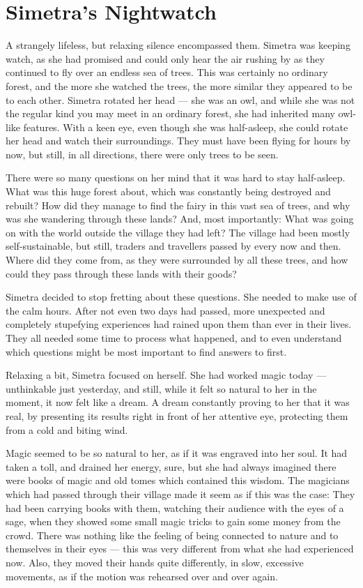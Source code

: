 \chapter{Simetra's Nightwatch}
\label{cha:simetras-nightwatch}
A strangely lifeless, but relaxing silence encompassed them. Simetra was keeping watch, as she had promised and could only hear the air rushing by as they continued to fly over an endless sea of trees. This was certainly no ordinary forest, and the more she watched the trees, the more similar they appeared to be to each other. Simetra rotated her head --- she was an owl, and while she was not the regular kind you may meet in an ordinary forest, she had inherited many owl-like features. With a keen eye, even though she was half-asleep, she could rotate her head and watch their surroundings. They must have been flying for hours by now, but still, in all directions, there were only trees to be seen.

There were so many questions on her mind that it was hard to stay half-asleep. What was this huge forest about, which was constantly being destroyed and rebuilt? How did they manage to find the fairy in this vast sea of trees, and why was she wandering through these lands? And, most importantly: What was going on with the world outside the village they had left?
The village had been mostly self-sustainable, but still, traders and travellers passed by every now and then. Where did they come from, as they were surrounded by all these trees, and how could they pass through these lands with their goods?

Simetra decided to stop fretting about these questions. She needed to make use of the calm hours. After not even two days had passed, more unexpected and completely stupefying experiences had rained upon them than ever in their lives. They all needed some time to process what happened, and to even understand which questions might be most important to find answers to first.

Relaxing a bit, Simetra focused on herself. She had worked magic today --- unthinkable just yesterday, and still, while it felt so natural to her in the moment, it now felt like a dream. A dream constantly proving to her that it was real, by presenting its results right in front of her attentive eye, protecting them from a cold and biting wind.

Magic seemed to be so natural to her, as if it was engraved into her soul. It had taken a toll, and drained her energy, sure, but she had always imagined there were books of magic and old tomes which contained this wisdom. The magicians which had passed through their village made it seem as if this was the case: They had been carrying books with them, watching their audience with the eyes of a sage, when they showed some small magic tricks to gain some money from the crowd. There was nothing like the feeling of being connected to nature and to themselves in their eyes --- this was very different from what she had experienced now. Also, they moved their hands quite differently, in slow, excessive movements, as if the motion was rehearsed over and over again.

